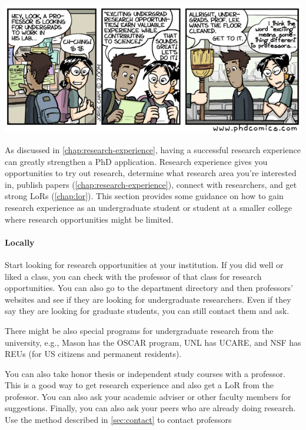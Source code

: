 \documentclass[oneside,11pt,dvipsnames]{book}
\begin{document}
\begin{center}
    \includegraphics[scale=0.5]{files/phd100404s.png}
  \end{center}

As discussed in \autoref{chap:research-experience}, having a successful research experience can greatly strengthen a PhD application. Research experience gives you opportunities to try out research, determine what research area you're interested in, publish papers (\autoref{chap:research-experience}), connect with researchers, and get strong LoRs (\autoref{chap:lor}). This section provides some guidance on how to gain research experience as an undergraduate student or student at a smaller college where research opportunities might be limited.

\paragraph{Locally} Start looking for research opportunities at your institution.
If you did well or liked a class, you can check with the professor of that class for research opportunities.
You can also go to the department directory and then professors' websites and see if they are looking for undergraduate researchers.
Even if they say they are looking for graduate students, you can still contact them and ask.

There might be also special programs for undergraduate research from the university, e.g., Mason has the OSCAR program, UNL has UCARE, and NSF has REUs (for US citizens and permanent residents).

You can also take honor thesis or independent study courses with a professor.  This is a good way to get research experience and also get a LoR from the professor.  You can also ask your academic adviser or other faculty members for suggestions.  Finally, you can also ask your peers who are already doing research.  Use the method described in \autoref{sec:contact} to contact professors
\end{document}
